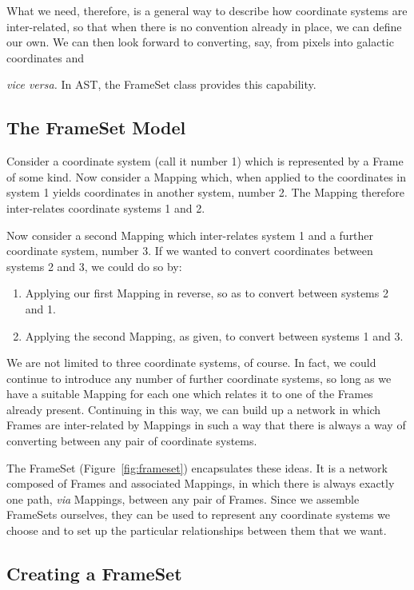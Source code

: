 \documentclass[twoside,11pt]{starlink}
\begin{document}
What we need, therefore, is a general way to describe how coordinate
systems are inter-related, so that when there is no convention already
in place, we can define our own. We can then look forward to
converting, say, from pixels into galactic coordinates and {\emph{vice
versa.}  In AST, the FrameSet class provides this capability.

\subsection{The FrameSet Model}

Consider a coordinate system (call it number 1) which is represented
by a Frame of some kind. Now consider a Mapping which, when applied to
the coordinates in system 1 yields coordinates in another system,
number 2. The Mapping therefore inter-relates coordinate systems 1 and
2.

Now consider a second Mapping which inter-relates system 1 and a
further coordinate system, number 3. If we wanted to convert
coordinates between systems 2 and 3, we could do so by:

\begin{enumerate}
\item Applying our first Mapping in reverse, so as to convert between
systems 2 and 1.

\item Applying the second Mapping, as given, to convert between
systems 1 and 3.
\end{enumerate}

We are not limited to three coordinate systems, of course. In fact, we
could continue to introduce any number of further coordinate systems,
so long as we have a suitable Mapping for each one which relates it to
one of the Frames already present. Continuing in this way, we can
build up a network in which Frames are inter-related by Mappings in
such a way that there is always a way of converting between any pair
of coordinate systems.

The FrameSet (Figure~\ref{fig:frameset}) encapsulates these ideas.  It
is a network composed of Frames and associated Mappings, in which
there is always exactly one path, \emph{via} Mappings, between any
pair of Frames.  Since we assemble FrameSets ourselves, they can be
used to represent any coordinate systems we choose and to set up the
particular relationships between them that we want.

\subsection{\label{ss:creatingaframeset}Creating a FrameSet}

}
\end{document}
